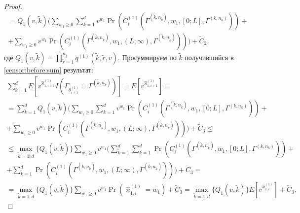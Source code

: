 \documentclass[a4paper,12pt,russian]{extarticle}
\begin{document}
\begin{proof}
\begin{multline}
  = Q_1(v,\tilde{k})  \biggl(\sum_{w_1\geqslant 0} \sum_{k=1}^d v^{w_1} \Pr(C_i^{(1)}(\Gamma^{(\tilde{k},n_{\tilde{k}})},w_1,[0;L],\Gamma^{(k,n_k)} )) + \\
   + \sum_{w_1\geqslant 0}  v^{w_1} \Pr(C_i^{(1)}(\Gamma^{(\tilde{k},n_{\tilde{k}})},w_1,(L;\infty),\Gamma^{(\tilde{k},n_{\tilde{k}})} ))\biggr) + \widetilde{C}_2,
   \label{censor:before:sum}
  \end{multline}
где $Q_1(v,\tilde{k})= \prod_{\tilde{r}=1}^{n_{\tilde{k}}} q^{(1)}(\tilde{k},\tilde{r},v) $. Просуммируем по $\tilde{k}$ получившийся в \eqref{censor:before:sum} результат:
\allowdisplaybreaks
\begin{multline*}
\sum_{\tilde{k}=1}^d E[v^{\hat{\varkappa}_{1,i+1}^{(1)}} I(\Gamma_{\theta_{i+1}^{(1)}}= \Gamma^{(\tilde{k},n_{\tilde{k}})})]=   E[v^{\hat{\varkappa}_{1,i+1}^{(1)}} ]=\\
  = \sum_{\tilde{k}=1}^d Q_1(v,\tilde{k})  \biggl(\sum_{w_1\geqslant 0} \sum_{k=1}^d v^{w_1} \Pr(C_i^{(1)}(\Gamma^{(\tilde{k},n_{\tilde{k}})},w_1,[0;L],\Gamma^{(k,n_k)} )) + \\
   + \sum_{w_1\geqslant 0}  v^{w_1} \Pr(C_i^{(1)}(\Gamma^{(\tilde{k},n_{\tilde{k}})},w_1,(L;\infty),\Gamma^{(\tilde{k},n_{\tilde{k}})} ))\biggr) + \widetilde{C}_3 \leqslant \\ \leqslant
   \max_{ \tilde{k}=\overline{1;d} }{\{Q_1(v,\tilde{k}) \}} \sum_{w_1\geqslant 0}  v^{w_1} \biggl(\sum_{\tilde{k}=1}^d \sum_{k=1}^d  \Pr(C_i^{(1)}(\Gamma^{(\tilde{k},n_{\tilde{k}})},w_1,[0;L],\Gamma^{(k,n_k)} )) + \\
   +  \sum_{\tilde{k}=1}^d \Pr(C_i^{(1)}(\Gamma^{(\tilde{k},n_{\tilde{k}})},w_1,(L;\infty),\Gamma^{(\tilde{k},n_{\tilde{k}})} ))\biggr) + \widetilde{C}_3 = \\
   =\max_{ \tilde{k}=\overline{1;d} }{\{Q_1(v,\tilde{k}) \}} \sum_{w_1\geqslant 0}  v^{w_1} \Pr(\hat{\varkappa}_{1,i}^{(1)}=w_1)+ \widetilde{C}_3=\max_{ \tilde{k}=\overline{1;d} }{\{Q_1(v,\tilde{k}) \}} E[v^{\hat{\varkappa}_{1,i}^{(1)}} ]+ \widetilde{C}_3.
  \end{multline*}


\end{proof}
\end{document}
